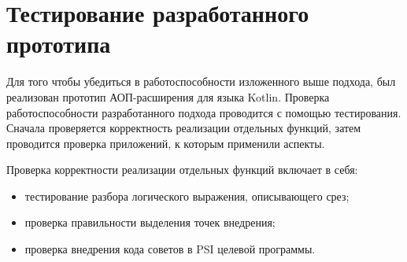 \documentclass[conference]{IEEEtran}
\begin{document}


\section{Тестирование разработанного прототипа}


Для того чтобы убедиться в работоспособности изложенного выше подхода, был
реализован прототип АОП-расширения для языка Kotlin.
Проверка работоспособности разработанного подхода проводится с помощью
тестирования.
Сначала проверяется корректность реализации отдельных функций, затем проводится 
проверка приложений, к которым применили аспекты. 

Проверка  корректности реализации отдельных функций включает в себя:
\begin{itemize}
    \item тестирование разбора логического выражения, описывающего срез;
    \item проверка правильности выделения точек внедрения;
    \item проверка внедрения кода советов в PSI целевой программы.
\end{itemize}
\end{document}
